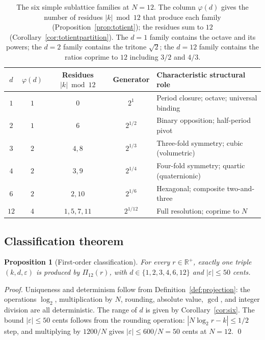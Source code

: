 \documentclass[11pt,a4paper]{article}
\newtheorem{proposition}[theorem]{Proposition}
\theoremstyle{definition}
\theoremstyle{remark}
\newcommand{\R}{\mathbb{R}}
\newcommand{\eps}{\varepsilon}
\begin{document}
\begin{table}[h]
\centering
\begin{tabular}{@{}c c c c l@{}}
\toprule
$d$ & $\varphi(d)$ & Residues $|k|\bmod 12$ & Generator & Characteristic structural role\\
\midrule
$1$ & $1$ & $0$ & $2^{1}$ & Period closure; octave; universal binding\\
$2$ & $1$ & $6$ & $2^{1/2}$ & Binary opposition; half-period pivot\\
$3$ & $2$ & $4,8$ & $2^{1/3}$ & Three-fold symmetry; cubic (volumetric)\\
$4$ & $2$ & $3,9$ & $2^{1/4}$ & Four-fold symmetry; quartic (quaternionic)\\
$6$ & $2$ & $2,10$ & $2^{1/6}$ & Hexagonal; composite two-and-three\\
$12$ & $4$ & $1,5,7,11$ & $2^{1/12}$ & Full resolution; coprime to $N$\\
\bottomrule
\end{tabular}
\caption{The six simple sublattice families at $N=12$. The column $\varphi(d)$ gives the number of residues $|k|\bmod 12$ that produce each family (Proposition~\ref{prop:totient}); the residues sum to $12$ (Corollary~\ref{cor:totientpartition}). The $d=1$ family contains the octave and its powers; the $d=2$ family contains the tritone $\sqrt{2}$; the $d=12$ family contains the ratios coprime to $12$ including $3/2$ and $4/3$.}
\label{tab:families}
\end{table}

\subsection{Classification theorem}

\begin{proposition}[First-order classification]\label{prop:classification}
For every $r\in\R^{+}$, exactly one triple $(k,d,\eps)$ is produced by $\Pi_{12}(r)$, with $d\in\{1,2,3,4,6,12\}$ and $|\eps|\le 50$ cents.
\end{proposition}

\begin{proof}
Uniqueness and determinism follow from Definition~\ref{def:projection}: the operations $\log_{2}$, multiplication by $N$, rounding, absolute value, $\gcd$, and integer division are all deterministic. The range of $d$ is given by Corollary~\ref{cor:six}. The bound $|\eps|\le 50$ cents follows from the rounding operation: $|N\log_{2}r - k|\le 1/2$ step, and multiplying by $1200/N$ gives $|\eps|\le 600/N=50$ cents at $N=12$. \qed
\end{proof}
\end{document}
